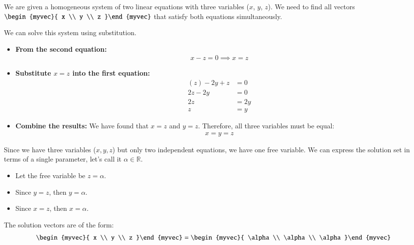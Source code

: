 \documentclass[journal]{IEEEtran}
\begin{document}
We are given a homogeneous system of two linear equations with three variables ($x$, $y$, $z$). We need to find all vectors $\begin{myvec}{ x \\ y \\ z }\end{myvec}$ that satisfy both equations simultaneously.

We can solve this system using substitution.

\begin{itemize}
    \item \textbf{From the second equation:}
    \begin{align}
    x - z = 0 \implies x = z
    \end{align}
    
    \item \textbf{Substitute $x = z$ into the first equation:}
    \begin{align}
        (z) - 2y + z &= 0 \\
        2z - 2y &= 0 \\
        2z &= 2y \\
        z &= y
    \end{align}
    
    \item \textbf{Combine the results:}
    We have found that $x = z$ and $y = z$. Therefore, all three variables must be equal:
    \begin{align}
    x = y = z
    \end{align}
\end{itemize}


Since we have three variables ($x, y, z$) but only two independent equations, we have one free variable. We can express the solution set in terms of a single parameter, let's call it $\alpha \in \mathbb{R}$.

\begin{itemize}
    \item Let the free variable be $z = \alpha$.
    \item Since $y = z$, then $y = \alpha$.
    \item Since $x = z$, then $x = \alpha$.
\end{itemize}

The solution vectors are of the form:
\begin{align}
\begin{myvec}{ x \\ y \\ z }\end{myvec} = 
\begin{myvec}{ \alpha \\ \alpha \\ \alpha }\end{myvec}
\end{align}
\end{document}
